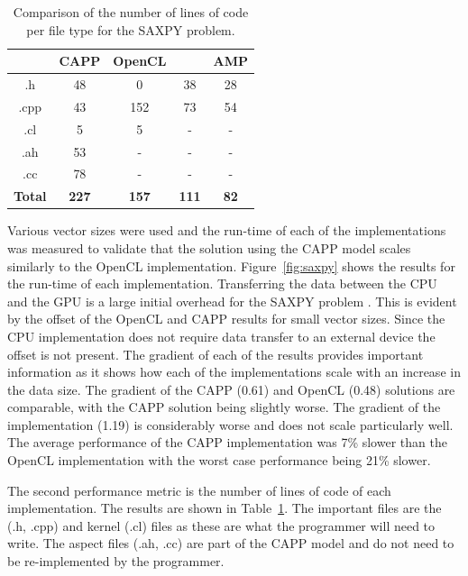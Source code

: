 \documentclass{sig-alternate-05-2015}
\begin{document}
\begin{table}[!b]
\centering
\caption{Comparison of the number of lines of code per file type for the SAXPY
problem.}
\label{tab:saxpy}
\begin{tabular}{|c|c|c|c|c|} 
	\hline
				    & CAPP			& OpenCL		& \CPP	    & \CPP AMP      \\ \hline
    .h				& 48			& 0				& 38	    & 28            \\ \hline
    .cpp			& 43			& 152			& 73	    & 54            \\ \hline
    .cl				& 5				& 5				& -		    & -             \\ \hline
    .ah				& 53			& -				& -		    & -             \\ \hline
    .cc				& 78			& -				& -		    & -             \\ \hline
    \textbf{Total}	& \textbf{227}	& \textbf{157}	& \textbf{111}	& \textbf{82}	\\ \hline		
\hline
\end{tabular}
\end{table}

Various vector sizes were used and the run-time of each of the implementations
was measured to validate that the solution using the
CAPP model scales similarly to the OpenCL implementation. Figure~\ref{fig:saxpy} 
shows the results for the run-time of each implementation. Transferring
the data between the CPU and the GPU is a large initial overhead for the SAXPY problem
\cite{gregg:saxpy}. This is evident by the offset of the
OpenCL and CAPP results for small vector sizes. Since the CPU implementation
does not require data transfer to an external device the offset is not present.
The gradient of each of the results provides important information as it shows
how each of the implementations scale with an increase in the data size. 
The gradient of the CAPP (0.61) and OpenCL (0.48) solutions are comparable, with
the CAPP solution being slightly worse. The gradient of the \CPP
implementation (1.19) is considerably worse and does not scale particularly
well. The average performance of the CAPP implementation was 7\% slower
than the OpenCL implementation with the worst case performance being 21\%
slower.

The second performance metric is the number of lines
of code of each implementation. The results are shown in 
Table~\ref{tab:saxpy}. The important files are the \CPP (.h, .cpp) and kernel (.cl)
files as these are what the programmer will need to write. The aspect files (.ah, .cc) are
part of the CAPP model and do not need to be re-implemented by the programmer. 
\end{document}
